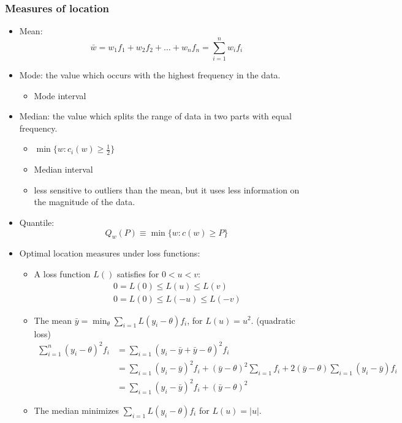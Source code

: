 \subsubsection{Measures of location}

\begin{itemize}
    \item Mean: \[
              \bar{w} = w_1f_1 + w_2f_2 + \dots + w_nf_n = \sum_{i=1}^{n} w_if_i
          \]
    \item Mode: the value which occurs with the highest frequency in the data. \begin{itemize}
              \item Mode interval
          \end{itemize}
    \item Median: the value which splits the range of data in two parts with equal frequency. \begin{itemize}
              \item $\min\{w: c_i(w) \geq \frac{1}{2}\}$
              \item Median interval
              \item less sensitive to outliers than the mean, but it uses less information on the magnitude of the data.
          \end{itemize}
    \item Quantile: \[
              Q_w(P) \equiv \min\{w: c(w)\geq P\}
          \]
    \item Optimal location measures under loss functions: \begin{itemize}
              \item A loss function $L()$ satisfies for $0<u<v$: \begin{align*}
                         & 0=L(0) \leq L(u) \leq L(v)   \\
                         & 0=L(0) \leq L(-u) \leq L(-v)
                    \end{align*}
              \item The mean $\bar{y} = \min_\theta \sum_{i=1}^{}L(y_i-\theta)f_i$, for $L(u) = u ^{2}$. (quadratic loss) \begin{align*}
                        \sum_{i=1}^{n} (y_i-\theta)^{2}f_i & = \sum_{i=1}^{} (y_i-\bar{y}+\bar{y}-\theta)^{2}f_i                                                                            \\
                                                           & = \sum_{i=1}^{} (y_i-\bar{y})^{2}f_i + (\bar{y}-\theta)^{2}\sum_{i=1}^{} f_i + 2(\bar{y}-\theta)\sum_{i=1}^{} (y_i-\bar{y})f_i \\
                                                           & = \sum_{i=1}^{} (y_i-\bar{y})^{2}f_i + (\bar{y}-\theta)^{2}
                    \end{align*}
              \item The median minimizes $\sum_{i=1}^{}L(y_i-\theta)f_i$ for $L(u) = \left| u \right| $.
          \end{itemize}
\end{itemize}

